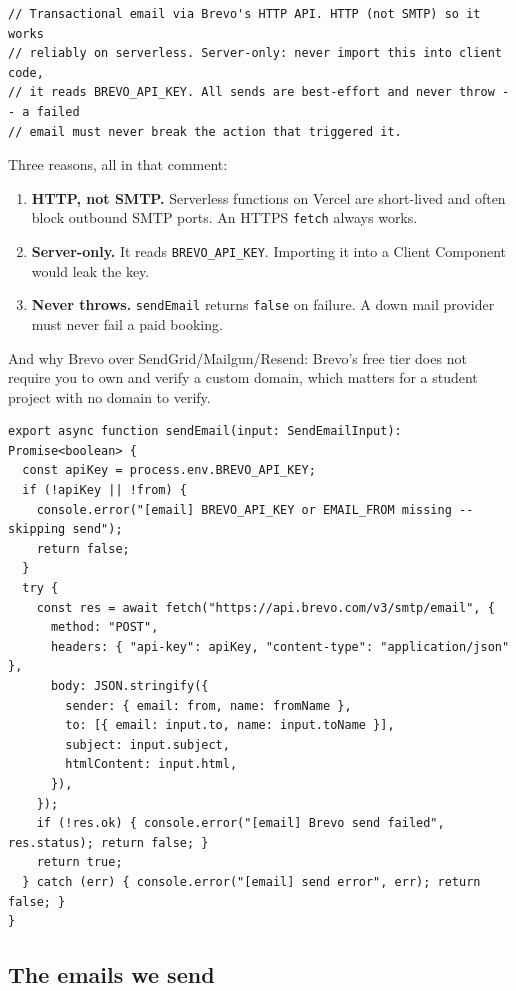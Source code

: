 \documentclass[11pt,a4paper]{article}
\begin{document}
\begin{lstlisting}[language=TS,caption={lib/email.ts --- the header comment is the answer}]
// Transactional email via Brevo's HTTP API. HTTP (not SMTP) so it works
// reliably on serverless. Server-only: never import this into client code,
// it reads BREVO_API_KEY. All sends are best-effort and never throw -- a failed
// email must never break the action that triggered it.
\end{lstlisting}

Three reasons, all in that comment:

\begin{enumerate}[leftmargin=*,noitemsep]
  \item \textbf{HTTP, not SMTP.} Serverless functions on Vercel are short-lived
        and often block outbound SMTP ports. An HTTPS \texttt{fetch} always works.
  \item \textbf{Server-only.} It reads \texttt{BREVO\_API\_KEY}. Importing it into
        a Client Component would leak the key.
  \item \textbf{Never throws.} \texttt{sendEmail} returns \texttt{false} on
        failure. A down mail provider must never fail a paid booking.
\end{enumerate}

And why Brevo over SendGrid/Mailgun/Resend: Brevo's free tier does not require you
to own and verify a custom domain, which matters for a student project with no
domain to verify.

\begin{lstlisting}[language=TS,caption={lib/email.ts}]
export async function sendEmail(input: SendEmailInput): Promise<boolean> {
  const apiKey = process.env.BREVO_API_KEY;
  if (!apiKey || !from) {
    console.error("[email] BREVO_API_KEY or EMAIL_FROM missing -- skipping send");
    return false;
  }
  try {
    const res = await fetch("https://api.brevo.com/v3/smtp/email", {
      method: "POST",
      headers: { "api-key": apiKey, "content-type": "application/json" },
      body: JSON.stringify({
        sender: { email: from, name: fromName },
        to: [{ email: input.to, name: input.toName }],
        subject: input.subject,
        htmlContent: input.html,
      }),
    });
    if (!res.ok) { console.error("[email] Brevo send failed", res.status); return false; }
    return true;
  } catch (err) { console.error("[email] send error", err); return false; }
}
\end{lstlisting}

\subsection{The emails we send}
\end{document}
